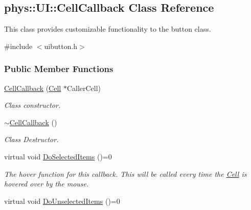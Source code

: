 \hypertarget{classphys_1_1UI_1_1CellCallback}{
\subsection{phys::UI::CellCallback Class Reference}
\label{de/da6/classphys_1_1UI_1_1CellCallback}
}


This class provides customizable functionality to the button class.  




{\ttfamily \#include $<$uibutton.h$>$}

\subsubsection*{Public Member Functions}
\begin{DoxyCompactItemize}
\item 
\hyperlink{classphys_1_1UI_1_1CellCallback_aec625f93fd825617c7e265f5529516ba}{CellCallback} (\hyperlink{classphys_1_1UI_1_1Cell}{Cell} $\ast$CallerCell)
\begin{DoxyCompactList}\small\item\em Class constructor. \item\end{DoxyCompactList}\item 
\hypertarget{classphys_1_1UI_1_1CellCallback_a15a79254993a90a50e7c6efe60a2089a}{
\hyperlink{classphys_1_1UI_1_1CellCallback_a15a79254993a90a50e7c6efe60a2089a}{$\sim$CellCallback} ()}
\label{de/da6/classphys_1_1UI_1_1CellCallback_a15a79254993a90a50e7c6efe60a2089a}

\begin{DoxyCompactList}\small\item\em Class Destructor. \item\end{DoxyCompactList}\item 
\hypertarget{classphys_1_1UI_1_1CellCallback_a7412178ba0954b416418f1ba574957b4}{
virtual void \hyperlink{classphys_1_1UI_1_1CellCallback_a7412178ba0954b416418f1ba574957b4}{DoSelectedItems} ()=0}
\label{de/da6/classphys_1_1UI_1_1CellCallback_a7412178ba0954b416418f1ba574957b4}

\begin{DoxyCompactList}\small\item\em The hover function for this callback. This will be called every time the \hyperlink{classphys_1_1UI_1_1Cell}{Cell} is hovered over by the mouse. \item\end{DoxyCompactList}\item 
\hypertarget{classphys_1_1UI_1_1CellCallback_ae395358b35ba72c7195e1b2704543fb1}{
virtual void \hyperlink{classphys_1_1UI_1_1CellCallback_ae395358b35ba72c7195e1b2704543fb1}{DoUnselectedItems} ()=0}
\label{de/da6/classphys_1_1UI_1_1CellCallback_ae395358b35ba72c7195e1b2704543fb1}


\end{DoxyCompactItemize}
